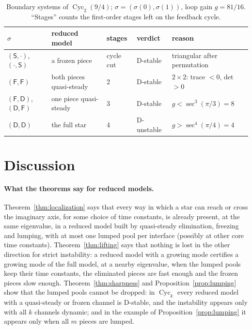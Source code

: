 \documentclass[11pt,a4paper]{article}
\theoremstyle{plain}
\theoremstyle{definition}
\theoremstyle{remark}
\newcommand{\Cyc}{\operatorname{Cyc}}
\newcommand{\rF}{\mathsf{F}}
\newcommand{\rS}{\mathsf{S}}
\newcommand{\rD}{\mathsf{D}}
\begin{document}
\begin{table}[tb]
\centering\small
\caption{Boundary systems of $\Cyc_2(9/4)$; $\sigma=(\sigma(0),\sigma(1))$, loop gain
$g=81/16$. ``Stages'' counts the first-order stages left on the feedback cycle.}\label{tab:cyc2}
\begin{tabular}{@{}lllll@{}}
\toprule
$\sigma$ & reduced model & stages & verdict & reason\\
\midrule
$(\rS,\cdot)$, $(\cdot,\rS)$ & a frozen piece & cycle cut & D-stable & triangular after permutation\\
$(\rF,\rF)$ & both pieces quasi-steady & 2 & D-stable & $2\times2$: trace $<0$, det $>0$\\
$(\rF,\rD)$, $(\rD,\rF)$ & one piece quasi-steady & 3 & D-stable & $g<\sec^3(\pi/3)=8$\\
$(\rD,\rD)$ & the full star & 4 & D-unstable & $g>\sec^4(\pi/4)=4$\\
\bottomrule
\end{tabular}
\end{table}

\section{Discussion}\label{sec:discussion}

\paragraph{What the theorems say for reduced models.} Theorem~\ref{thm:localization} says
that every way in which a star can reach or cross the imaginary axis, for some choice of
time constants, is already present, at the same eigenvalue, in a reduced model built by
quasi-steady elimination, freezing and lumping, with at most one lumped pool per interface
(possibly at other core time constants). Theorem~\ref{thm:lifting} says that nothing is lost
in the other direction for strict instability: a reduced model with a growing mode certifies
a growing mode of the full model, at a nearby eigenvalue, when the lumped pools keep their
time constants, the eliminated pieces are fast enough and the frozen pieces slow enough.
Theorem~\ref{thm:sharpness} and Proposition~\ref{prop:lumping} show that the lumped pools
cannot be dropped: in $\Cyc_k$ every reduced model with a quasi-steady or frozen channel is
D-stable, and the instability appears only with all $k$ channels dynamic; and in the example
of Proposition~\ref{prop:lumping} it appears only when all $m$ pieces are lumped.
\end{document}
